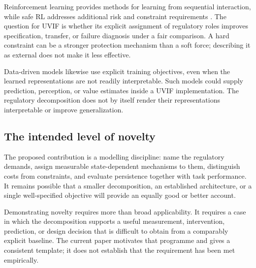 Reinforcement learning provides methods for learning from sequential interaction, while safe RL addresses additional risk and constraint requirements \citep{garcia2015saferl}. The question for UVIF is whether its explicit assignment of regulatory roles improves specification, transfer, or failure diagnosis under a fair comparison. A hard constraint can be a stronger protection mechanism than a soft force; describing it as external does not make it less effective.

Data-driven models likewise use explicit training objectives, even when the learned representations are not readily interpretable. Such models could supply prediction, perception, or value estimates inside a UVIF implementation. The regulatory decomposition does not by itself render their representations interpretable or improve generalization.

\subsection{The intended level of novelty}
The proposed contribution is a modelling discipline: name the regulatory demands, assign measurable state-dependent mechanisms to them, distinguish costs from constraints, and evaluate persistence together with task performance. It remains possible that a smaller decomposition, an established architecture, or a single well-specified objective will provide an equally good or better account.

Demonstrating novelty requires more than broad applicability. It requires a case in which the decomposition supports a useful measurement, intervention, prediction, or design decision that is difficult to obtain from a comparably explicit baseline. The current paper motivates that programme and gives a consistent template; it does not establish that the requirement has been met empirically.
